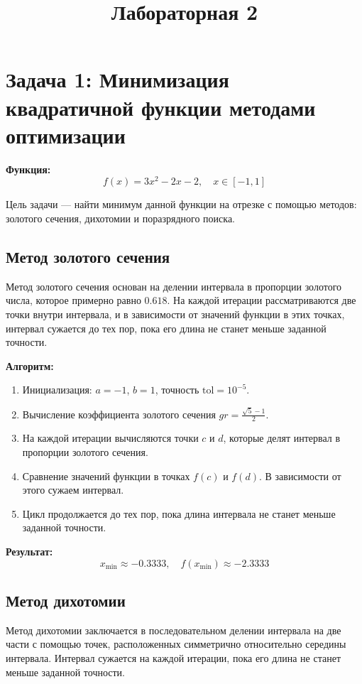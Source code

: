 \documentclass[a4paper,12pt]{article}
\title{Лабораторная 2}
\author{}
\date{}
\begin{document}
\maketitle

\section{Задача 1: Минимизация квадратичной функции методами оптимизации}

\textbf{Функция:} 
\[
f(x) = 3x^2 - 2x - 2, \quad x \in [-1, 1]
\]

Цель задачи — найти минимум данной функции на отрезке с помощью методов: золотого сечения, дихотомии и поразрядного поиска.

\subsection{Метод золотого сечения}

Метод золотого сечения основан на делении интервала в пропорции золотого числа, которое примерно равно \(0.618\). На каждой итерации рассматриваются две точки внутри интервала, и в зависимости от значений функции в этих точках, интервал сужается до тех пор, пока его длина не станет меньше заданной точности.

\textbf{Алгоритм:}
\begin{enumerate}
    \item Инициализация: \( a = -1 \), \( b = 1 \), точность \( \text{tol} = 10^{-5} \).
    \item Вычисление коэффициента золотого сечения \( gr = \frac{\sqrt{5} - 1}{2} \).
    \item На каждой итерации вычисляются точки \( c \) и \( d \), которые делят интервал в пропорции золотого сечения.
    \item Сравнение значений функции в точках \( f(c) \) и \( f(d) \). В зависимости от этого сужаем интервал.
    \item Цикл продолжается до тех пор, пока длина интервала не станет меньше заданной точности.
\end{enumerate}

\textbf{Результат:}
\[
x_{\text{min}} \approx -0.3333, \quad f(x_{\text{min}}) \approx -2.3333
\]

\subsection{Метод дихотомии}

Метод дихотомии заключается в последовательном делении интервала на две части с помощью точек, расположенных симметрично относительно середины интервала. Интервал сужается на каждой итерации, пока его длина не станет меньше заданной точности.
\end{document}
